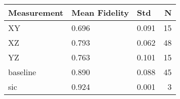 \begin{tabular}{lllr}
\toprule
Measurement & Mean Fidelity & Std & N \\
\midrule
XY & 0.696 & 0.091 & 15 \\
XZ & 0.793 & 0.062 & 48 \\
YZ & 0.763 & 0.101 & 15 \\
baseline & 0.890 & 0.088 & 45 \\
sic & 0.924 & 0.001 & 3 \\
\bottomrule
\end{tabular}
